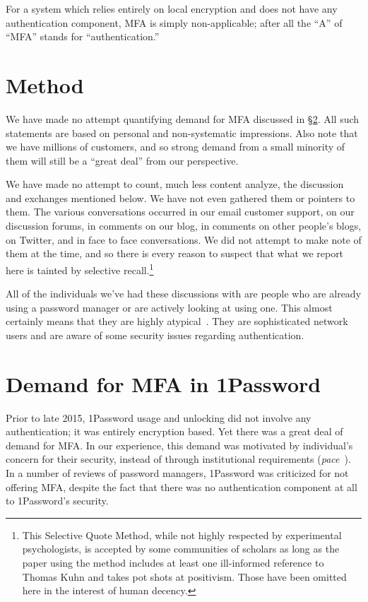 \documentclass{soups}
\begin{document}
For a system which relies entirely on local encryption and does not have any authentication component, MFA is simply non-applicable;
after all the “A” of “MFA” stands for “authentication.” 

\section{Method}

We have made no attempt quantifying demand for MFA discussed in \S\ref{sec:demand}.
All such statements are based on personal and non-systematic impressions.
Also note that we have millions of customers,
and so strong demand from a small minority of them will still be a “great deal” from our perspective.

We have made no attempt to count, much less content analyze, the discussion and exchanges mentioned below.
We have not even gathered them or pointers to them.
The various conversations occurred in our email customer support,
on our discussion forums,
in comments on our blog,
in comments on other people's blogs,
on Twitter,
and in face to face conversations. 
We did not attempt to make note of them at the time,
and so there is every reason to suspect that what we report here is tainted by selective recall.\footnote
  {This Selective Quote Method,
  while not highly respected by experimental psychologists,
  is accepted by some communities of scholars
  as long as the paper using the method includes
  at least one ill-informed reference to Thomas Kuhn
  and takes pot shots at positivism.
  Those have been omitted here in the interest of human decency.}

All of the individuals we've had these discussions with are people who are already using a password manager or are actively looking at using one.
This almost certainly means that they are highly atypical~\autocite{Stobert2014:agony}. 
They are sophisticated network users and are aware of some security issues regarding authentication.

\section{Demand for MFA in 1Password}\label{sec:demand}

Prior to late 2015, 1Password usage and unlocking did not involve any
authentication; it was entirely encryption based.
Yet there was a great deal of demand for MFA\@.
In our experience, this demand was motivated by individual's concern for their security,
instead of through institutional requirements (\textit{pace}~\autocite{CristofaroDFN13}).
In a number of reviews of password managers, 1Password was criticized for not offering MFA, despite the fact that there was no authentication component at all to 1Password's security.
\end{document}
